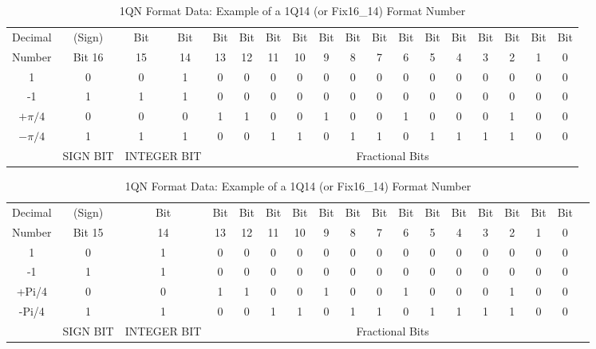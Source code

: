 \begin{landscape}
\begin{table}[!hbtp]
  \centering
  \caption{2QN Format Data: Example of a 2Q14 (or Fix17\_14) Format Number}
  \label{tab:2QNformat}%
  \centering
    \begin{tabular}{|c|c|c|c|c|c|c|c|c|c|c|c|c|c|c|c|c|c|}
    \toprule
    Decimal & (Sign)& Bit  & Bit & Bit  & Bit & Bit & Bit & Bit  & Bit & Bit  & Bit  & Bit  & Bit  & Bit  & Bit  & Bit  & Bit  \\
    Number & Bit 16 & 15 & 14 & 13 &   12 &   11 &   10 &   9 &   8 &   7 &   6 &   5 &   4 &   3 &   2 &   1 &   0 \\
    \midrule
    1     & 0     & 0     & 1     & 0     & 0     & 0     & 0     & 0     & 0     & 0     & 0     & 0     & 0     & 0     & 0     & 0     & 0 \\
    -1    & 1     & 1     & 1     & 0     & 0     & 0     & 0     & 0     & 0     & 0     & 0     & 0     & 0     & 0     & 0     & 0     & 0 \\
    $+\pi /4 $ & 0     & 0     & 0     & 1     & 1     & 0     & 0     & 1     & 0     & 0     & 1     & 0     & 0     & 0     & 1     & 0     & 0 \\
    $-\pi /4 $ & 1     & 1     & 1     & 0     & 0     & 1     & 1     & 0     & 1     & 1     & 0     & 1     & 1     & 1     & 1     & 0     & 0 \\
         & SIGN BIT & \multicolumn{2}{|c|}{INTEGER BIT} & \multicolumn{14}{|c|}{Fractional Bits}  \\
    \bottomrule
    \end{tabular}%

  \caption{1QN Format Data: Example of a 1Q14 (or Fix16\_14) Format Number}
  \label{tab:1QNformat}%
    \begin{tabular}{|c|c|c|c|c|c|c|c|c|c|c|c|c|c|c|c|c|c|}
    \toprule
    Decimal & (Sign) & Bit  & Bit  & Bit & Bit  & Bit  & Bit  & Bit  & Bit  & Bit  & Bit  & Bit  & Bit  & Bit  & Bit  & Bit  \\
    Number & Bit 15   &   14 &   13 &   12 &   11 &   10 &   9 &   8 &   7 &   6 &   5 &   4 &   3 &   2 &   1 &   0 \\
    \midrule
    1     & 0     & 1     & 0     & 0     & 0     & 0     & 0     & 0     & 0     & 0     & 0     & 0     & 0     & 0     & 0     & 0 \\
    -1    & 1     & 1     & 0     & 0     & 0     & 0     & 0     & 0     & 0     & 0     & 0     & 0     & 0     & 0     & 0     & 0 \\
    +Pi/4 & 0     & 0     & 1     & 1     & 0     & 0     & 1     & 0     & 0     & 1     & 0     & 0     & 0     & 1     & 0     & 0 \\
    -Pi/4 & 1     & 1     & 0     & 0     & 1     & 1     & 0     & 1     & 1     & 0     & 1     & 1     & 1     & 1     & 0     & 0 \\
          & SIGN BIT & INTEGER BIT & \multicolumn{14}{c}{Fractional Bits}     \\
    \bottomrule
    \end{tabular}%
      

\end{table}
\end{landscape}
